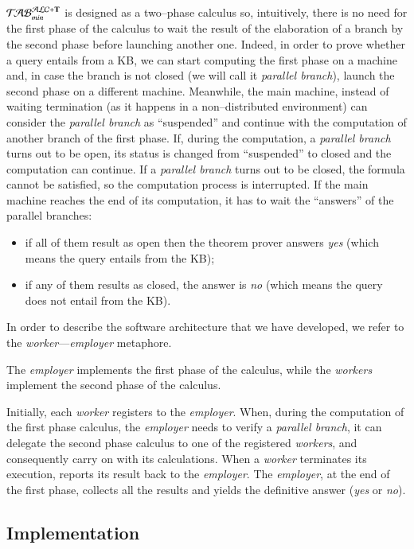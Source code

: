 \documentclass[a4paper, 11pt, oneside]{elsarticle}
\newcommand{\tip}{{\bf T}}
\newcommand{\nuovoc}{\mathrel{{\mathcal{T}\!\mathcal{AB}}}_{min}^{\mathcal{ALC}+\mbox{\scriptsize $\tip$}}}
\begin{document}
$\nuovoc$ is designed as a two--phase calculus so, intuitively, there is no need for the first phase of the calculus to wait the result of the elaboration of a branch by the second phase before launching another one.
Indeed, in order to prove whether a query entails from a KB, we can start computing the first phase on a machine and, in case the branch is not closed (we will call it \emph{parallel branch}), launch the second phase on a different machine.
Meanwhile, the main machine, instead of waiting termination (as it happens in a non--distributed environment) can consider the \emph{parallel branch} as ``suspended'' and continue with the computation of another branch of the first phase.
If, during the computation, a \emph{parallel branch} turns out to be open, its status is changed from ``suspended'' to closed and the computation can continue.
If a \emph{parallel branch} turns out to be closed, the formula cannot be satisfied, so the computation process is interrupted.
If the main machine reaches the end of its computation, it has to wait the ``answers'' of the parallel branches:
\begin{itemize}
\item if all of them result as open then the theorem prover answers \emph{yes} (which means the query entails from the KB);
\item if any of them results as closed, the answer is \emph{no} (which means the query does not entail from the KB).
\end{itemize}

In order to describe the software architecture that we have developed, we refer to the \emph{worker}---\emph{employer} metaphore.

The \emph{employer} implements the first phase of the calculus, while the \emph{workers} implement the second phase of the calculus.

Initially, each \emph{worker} registers to the \emph{employer}.
When, during the computation of the first phase calculus, the \emph{employer} needs to verify a \emph{parallel branch}, it can delegate the second phase calculus to one of the registered \emph{workers}, and consequently carry on with its calculations.
When a \emph{worker} terminates its execution, reports its result back to the \emph{employer}.
The \emph{employer}, at the end of the first phase, collects all the results and yields the definitive answer (\emph{yes} or \emph{no}).


\subsection{Implementation}
\end{document}
